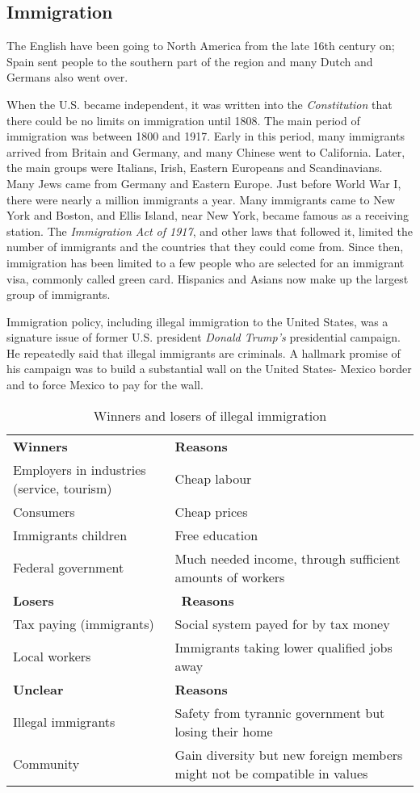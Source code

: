 \documentclass[10pt]{article}
\begin{document}
\subsection{Immigration}
	\label{sec:usa/immig}
The English have been going to North America from the late 16th century on; Spain sent people to the
southern part of the region and many Dutch and Germans also went over.

When the U.S. became independent, it was written into the \emph{Constitution} that there could be no
limits on immigration until 1808. The main period of immigration was between 1800 and 1917. Early
in this period, many immigrants arrived from Britain and Germany, and many Chinese went to
California. Later, the main groups were Italians, Irish, Eastern Europeans and Scandinavians. Many
Jews came from Germany and Eastern Europe. Just before World War I, there were nearly a million
immigrants a year. Many immigrants came to New York and Boston, and Ellis Island, near New York,
became famous as a receiving station. The \emph{Immigration Act of 1917}, and other laws that followed it,
limited the number of immigrants and the countries that they could come from. Since then,
immigration has been limited to a few people who are selected for an immigrant visa, commonly
called green card. Hispanics and Asians now make up the largest group of immigrants.

Immigration policy, including illegal immigration to the United States, was a signature issue of former
U.S. president \emph{Donald Trump's} presidential campaign. He repeatedly said that illegal immigrants are
criminals. A hallmark promise of his campaign was to build a substantial wall on the United States-
Mexico border and to force Mexico to pay for the wall.

\begin{table}[htbp]
	\centering
	\begin{tabularx}{\textwidth}{X|X}
		\hline
		{\sffamily\bfseries Winners} & {\sffamily\bfseries Reasons}\\
		Employers in industries (service, tourism) & Cheap labour \\
		Consumers & Cheap prices \\
		Immigrants children & Free education \\
		Federal government & Much needed income, through sufficient amounts of workers \\ \hline
		{\sffamily\bfseries Losers} & \ {\sffamily\bfseries Reasons}\\
		Tax paying (immigrants) & Social system payed for by tax money \\
		Local workers & Immigrants taking lower qualified jobs away \\ \hline
		{\sffamily\bfseries Unclear} & {\sffamily\bfseries Reasons}\\
		Illegal immigrants & Safety from tyrannic government but losing their home\\
		Community & Gain diversity but new foreign members might not be compatible in values \\ \hline
	\end{tabularx}
	\caption{Winners and losers of illegal immigration}
	\label{tab:usa/immig/win}
\end{table}
\end{document}

